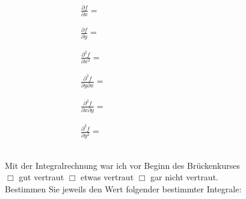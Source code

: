 \documentclass[12pt]{exam}
\begin{document}
\begin{questions}
\[\begin{array}{ll} ~~\\ 
\displaystyle\frac{\partial f}{\partial x}= \\ ~~\\~~\\
\displaystyle\frac{\partial f}{\partial y}= \\ ~~\\~~\\
\displaystyle\frac{\partial^2 f}{\partial x^2}= \\ ~~\\~~\\
\displaystyle\frac{\partial^2 f}{\partial y\partial x}= \\~~\\ ~~\\
\displaystyle\frac{\partial^2 f}{\partial x\partial y}= \\ ~~\\~~\\
\displaystyle\frac{\partial^2 f}{\partial y^2}= \\ ~~\\~~\\
\end{array}~~~~~~~~~~~~~~~~~~~~~~~~~~~~~~~~~~~~~~~~~~~~~~~~~~~~~~~~~~~~~~~~~~~~
\]

\pagebreak
{}

Mit der Integralrechnung war ich vor Beginn des Brückenkurses\\ $\Box$ gut vertraut \hfill $\Box$ etwas vertraut \hfill $\Box$ gar nicht vertraut. \\[2ex]
Bestimmen Sie jeweils den Wert folgender bestimmter Integrale:\\

\begin{parts}

\part \[\int_a^b x^3 {\rm ~d}x = 
~~~~~~~~~~~~~~~~~~~~~~~~~~~~~~~~~~~~~~~~~~~~~~~~~~~~~~~~~~~~~~~~~~~~~~~~~~~~\]
~~\\~~\\~~\\~~\\~~\\

\part \[\int_0^x \sinh u {\rm ~d}u = 
~~~~~~~~~~~~~~~~~~~~~~~~~~~~~~~~~~~~~~~~~~~~~~~~~~~~~~~~~~~~~~~~~~~~~~~~~~~~\]
~~\\~~\\~~\\~~\\~~\\


\end{parts}
\end{questions}
\end{document}
